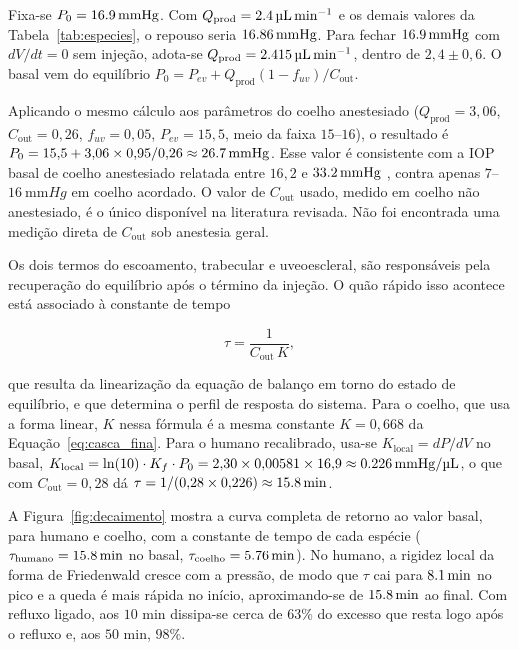 Fixa-se $P_0=\SI{16{,}9}{\milli\meter Hg}$. Com $Q_{\text{prod}}=\SI{2{,}4}{\micro\liter\per\minute}$ e os demais valores da Tabela~\ref{tab:especies}, o repouso seria $\SI{16{,}86}{\milli\meter Hg}$. Para fechar $\SI{16{,}9}{\milli\meter Hg}$ com $dV/dt=0$ sem injeção, adota-se $Q_{\text{prod}}=\SI{2{,}415}{\micro\liter\per\minute}$, dentro de $2{,}4\pm0{,}6$. O basal vem do equilíbrio $P_0=P_{ev}+Q_{\text{prod}}(1-f_{uv})/C_{\text{out}}$.
 
Aplicando o mesmo cálculo aos parâmetros do coelho anestesiado ($Q_{\text{prod}}=3{,}06$, $C_{\text{out}}=0{,}26$, $f_{uv}=0{,}05$, $P_{ev}=15{,}5$, meio da faixa $15$--$16$), o resultado é $P_0=15{,}5+3{,}06\times0{,}95/0{,}26\approx\SI{26{,}7}{\milli\meter Hg}$. Esse valor é consistente com a IOP basal de coelho anestesiado relatada entre $16{,}2$ e $\SI{33{,}2}{\milli\meter Hg}$ \citep{kiel2015evp}, contra apenas $7$--$\SI{16}{\milli\meter Hg}$ em coelho acordado. O valor de $C_{\text{out}}$ usado, medido em coelho não anestesiado, é o único disponível na literatura revisada. Não foi encontrada uma medição direta de $C_{\text{out}}$ sob anestesia geral.
 
Os dois termos do escoamento, trabecular e uveoescleral, são responsáveis pela recuperação do equilíbrio após o término da injeção. O quão rápido isso acontece está associado à constante de tempo
 
\begin{equation}
\tau = \frac{1}{C_{\text{out}}\,K},
\label{eq:tau}
\end{equation}
 
que resulta da linearização da equação de balanço em torno do estado de equilíbrio, e que determina o perfil de resposta do sistema. Para o coelho, que usa a forma linear, $K$ nessa fórmula é a mesma constante $K=0{,}668$ da Equação~\ref{eq:casca_fina}. Para o humano recalibrado, usa-se $K_{\text{local}}=dP/dV$ no basal, $K_{\text{local}}=\ln(10)\cdot K_f\cdot P_0=2{,}30\times0{,}00581\times16{,}9\approx\SI{0{,}226}{\milli\meter Hg\per\micro\liter}$, o que com $C_{\text{out}}=0{,}28$ dá $\tau=1/(0{,}28\times0{,}226)\approx\SI{15{,}8}{\minute}$.

A Figura~\ref{fig:decaimento} mostra a curva completa de retorno ao valor basal, para humano e coelho, com a constante de tempo de cada espécie ($\tau_{\text{humano}}=\SI{15{,}8}{\minute}$ no basal, $\tau_{\text{coelho}}=\SI{5{,}76}{\minute}$). No humano, a rigidez local da forma de Friedenwald cresce com a pressão, de modo que $\tau$ cai para $\SI{8{,}1}{\minute}$ no pico e a queda é mais rápida no início, aproximando-se de $\SI{15{,}8}{\minute}$ ao final. Com refluxo ligado, aos $10$ min dissipa-se cerca de $63\%$ do excesso que resta logo após o refluxo e, aos $50$ min, $98\%$.
 
